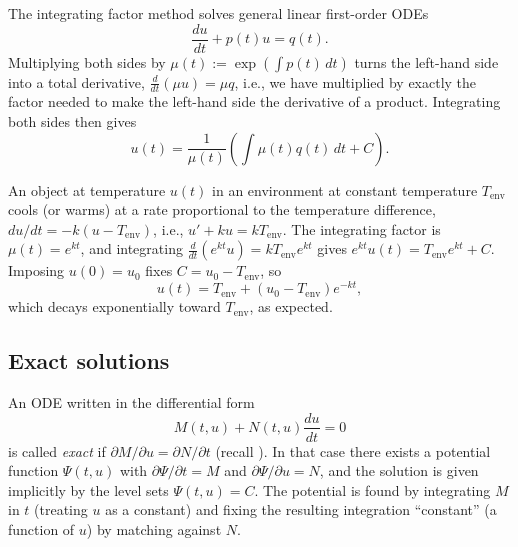 The integrating factor method solves general linear first-order ODEs
\begin{equation*}
    \frac{du}{dt} + p(t) u = q(t).
\end{equation*}
Multiplying both sides by $\mu(t) := \exp\left( \int p(t) \, dt
\right)$ turns the left-hand side into a total derivative,
$\frac{d}{dt}(\mu u) = \mu q$, i.e., we have multiplied by exactly the
factor needed to make the left-hand side the derivative of a product.
Integrating both sides then gives
\begin{equation*}
    u(t) = \frac{1}{\mu(t)} \left( \int \mu(t) q(t) \, dt + C \right).
\end{equation*}

\begin{example}
    An object at temperature $u(t)$ in an environment at constant
    temperature $T_{\mathrm{env}}$ cools (or warms) at a rate
    proportional to the temperature difference, $du/dt = -k(u -
    T_{\mathrm{env}})$, i.e., $u' + ku = kT_{\mathrm{env}}$. The
    integrating factor is $\mu(t) = e^{kt}$, and integrating
    $\frac{d}{dt}(e^{kt}u) = kT_{\mathrm{env}} e^{kt}$ gives $e^{kt}
    u(t) = T_{\mathrm{env}} e^{kt} + C$. Imposing $u(0) = u_0$ fixes
    $C = u_0 - T_{\mathrm{env}}$, so
    \begin{equation*}
        u(t) = T_{\mathrm{env}} + (u_0 - T_{\mathrm{env}}) e^{-kt},
    \end{equation*}
    which decays exponentially toward $T_{\mathrm{env}}$, as expected.
\end{example}

\subsection{Exact solutions}

An ODE written in the differential form
\begin{equation*}
    M(t,u) + N(t,u) \frac{du}{dt} = 0
\end{equation*}
is called \emph{exact} if $\partial M/\partial u = \partial N/\partial
t$ (recall ). In that case there exists a
potential function $\Psi(t,u)$ with $\partial \Psi/\partial t = M$ and
$\partial \Psi/\partial u = N$, and the solution is given implicitly by
the level sets $\Psi(t,u) = C$. The potential is found by integrating
$M$ in $t$ (treating $u$ as a constant) and fixing the resulting
integration ``constant'' (a function of $u$) by matching against $N$.

